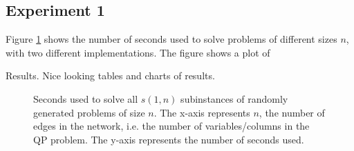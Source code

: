 \subsection{Experiment 1}
Figure \ref{fig:constructb1} shows the number of seconds used to solve problems
of different sizes $n$, with two different implementations.
The figure shows a plot of 
\begin{tabular}
\begin{table}
    
\end{table}
\end{tabular}

Results. Nice looking tables and charts of results.
\begin{figure}[ht!]
    \centering
    
    \label{fig:constructb1}
    \caption{Seconds used to solve all $s(1, n)$ subinstances of randomly
             generated problems of size $n$. The x-axis represents $n$, the
             number of edges in the network, i.e. the number of
             variables/columns in the QP problem. The y-axis represents the
             number of seconds used.}
\end{figure}
